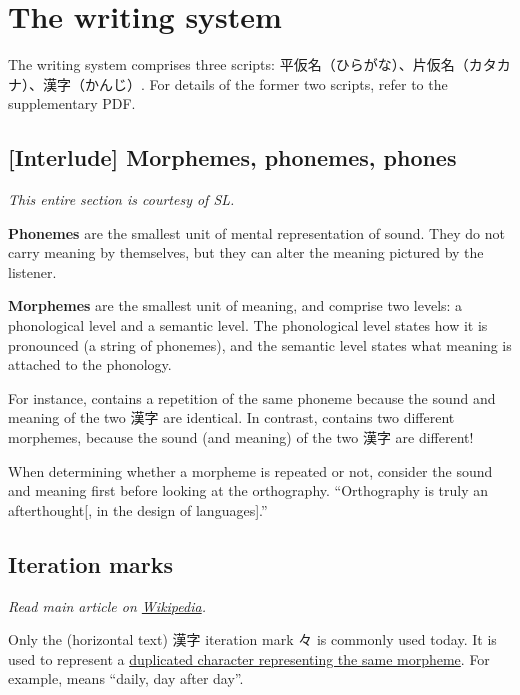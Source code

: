 \documentclass[../nihongo-gakushuu-kyouzai.tex]{subfiles}
\begin{document}
\setcounter{section}{0}
\section{The writing system}
The writing system comprises three scripts: 平仮名（ひらがな）、片仮名（カタカナ）、漢字（かんじ）. For details of the former two scripts, refer to the supplementary PDF.

\subsection{[Interlude] Morphemes, phonemes, phones}
\emph{This entire section is courtesy of SL.}

\textbf{Phonemes} are the smallest unit of mental representation of sound. They do not carry meaning by themselves, but they can alter the meaning pictured by the listener.

\textbf{Morphemes} are the smallest unit of meaning, and comprise two levels: a phonological level and a semantic level. The phonological level states how it is pronounced (a string of phonemes), and the semantic level states what meaning is attached to the phonology.

For instance,  contains a repetition of the same phoneme because the sound and meaning of the two 漢字 are identical. In contrast,  contains two different morphemes, because the sound (and meaning) of the two 漢字 are different!

When determining whether a morpheme is repeated or not, consider the sound and meaning first before looking at the orthography. ``Orthography is truly an afterthought[, in the design of languages].''


\subsection{Iteration marks}
\emph{Read main article on \href{https://en.wikipedia.org/wiki/Iteration_mark\#Japanese}{Wikipedia}.}

Only the (horizontal text) 漢字 iteration mark 々 is commonly used today. It is used to represent a \ul{duplicated character representing the same morpheme}. For example,  means ``daily, day after day''.
\end{document}
